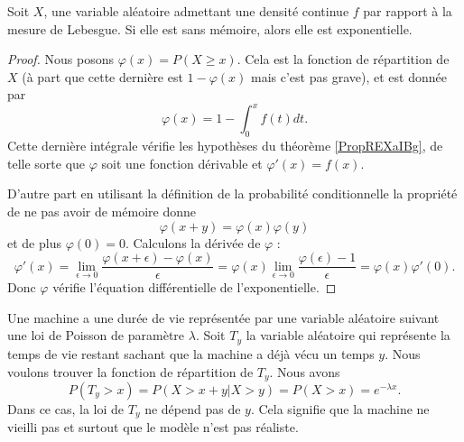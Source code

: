 \begin{proposition} \label{PropREXaIBg}
    Soit \( X\), une variable aléatoire admettant une densité continue \( f\) par rapport à la mesure de Lebesgue. Si elle est sans mémoire, alors elle est exponentielle.
\end{proposition}

\begin{proof}
    Nous posons \( \varphi(x)=P(X\geq x)\). Cela est la fonction de répartition de \( X\) (à part que cette dernière est \( 1-\varphi(x)\) mais c'est pas grave), et est donnée par
    \begin{equation}
        \varphi(x)=1-\int_0^xf(t)dt.
    \end{equation}
    Cette dernière intégrale vérifie les hypothèses du théorème \ref{PropREXaIBg}, de telle sorte que \( \varphi\) soit une fonction dérivable et \( \varphi'(x)=f(x)\).
    
    D'autre part en utilisant la définition de la probabilité conditionnelle la propriété de ne pas avoir de mémoire donne
    \begin{equation}
        \varphi(x+y)=\varphi(x)\varphi(y)
    \end{equation}
    et de plus \( \varphi(0)=0\). Calculons la dérivée de \( \varphi\) :
    \begin{equation}
        \varphi'(x)=\lim_{\epsilon\to 0}\frac{ \varphi(x+\epsilon)-\varphi(x) }{ \epsilon }=\varphi(x)\lim_{\epsilon\to 0}\frac{ \varphi(\epsilon)-1 }{ \epsilon }=\varphi(x)\varphi'(0).
    \end{equation}
    Donc \( \varphi\) vérifie l'équation différentielle de l'exponentielle.
    
\end{proof}

\begin{example}
    Une machine a une durée de vie représentée par une variable aléatoire suivant une loi de Poisson de paramètre \( \lambda\). Soit \( T_y\) la variable aléatoire qui représente la temps de vie restant sachant que la machine a déjà vécu un temps \( y\). Nous voulons trouver la fonction de répartition de \( T_y\). Nous avons
    \begin{equation}
        P(T_y>x)=P(X>x+y|X>y)=P(X>x)= e^{-\lambda x}.
    \end{equation}
    Dans ce cas, la loi de \( T_y\) ne dépend pas de \( y\). Cela signifie que la machine ne vieilli pas et surtout que le modèle n'est pas réaliste.
\end{example}

